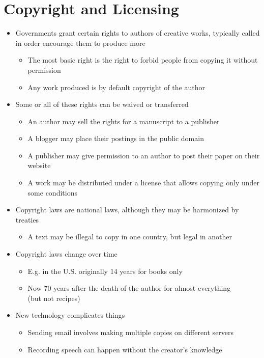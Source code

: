 \documentclass[a4paper,landscape,headrule,footrule,xetex]{foils}
\begin{document}
\section{Copyright and Licensing}

\begin{itemize}
\item Governments grant certain rights to authors of creative works,
  typically called  in order encourage them
  to produce more
  \begin{itemize}
  \item The most basic right is the right to forbid people from
    copying it without permission
  \item Any work produced is by default copyright of the author
  \end{itemize}
\item Some or all of these rights can be waived or transferred
  \begin{itemize}
  \item An author may sell the rights for a manuscript to a publisher
  \item A blogger may place their postings in the public domain
  \item A publisher may give permission to an author to post their
    paper on their website
  \item A work may be distributed under a license that allows copying only under some conditions
  \end{itemize}
\newpage
\item Copyright laws are national laws, although they may be
  harmonized by treaties
  \begin{itemize}
  \item A text may be illegal to copy in one country, but legal in another
  \end{itemize}
\item Copyright laws change over time
  \begin{itemize}
  \item E.g. in the U.S. originally 14 years for books only
  \item Now 70 years after the death of the author for almost
    everything \\ (but not recipes)
  \end{itemize}
\item New technology complicates things
  \begin{itemize}
  \item Sending email involves making multiple copies on different servers
  \item Recording speech can happen without the creator's knowledge
  \end{itemize}
\end{itemize}
\end{document}
